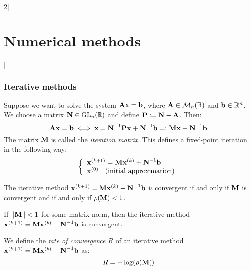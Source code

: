 \documentclass[../../../main.tex]{subfiles}
\begin{document}
\begin{multicols}{2}[\section{Numerical methods}]
  \subsubsection{Iterative methods}
  \begin{definition}
    Suppose we want to solve the system $\boldsymbol{\mathrm{A}}\boldsymbol{\mathrm{x}}=\boldsymbol{\mathrm{b}}$, where $\boldsymbol{\mathrm{A}}\in\mathcal{M}_n(\mathbb{R})$ and $\boldsymbol{\mathrm{b}}\in\mathbb{R}^n$. We choose a matrix $\boldsymbol{\mathrm{N}}\in\mathrm{GL}_n(\mathbb{R})$ and define $\boldsymbol{\mathrm{P}}:=\boldsymbol{\mathrm{N}}-\boldsymbol{\mathrm{A}}$. Then: $$\boldsymbol{\mathrm{A}}\boldsymbol{\mathrm{x}}=\boldsymbol{\mathrm{b}}\iff \boldsymbol{\mathrm{x}}=\boldsymbol{\mathrm{N}}^{-1}\boldsymbol{\mathrm{P}}\boldsymbol{\mathrm{x}}+\boldsymbol{\mathrm{N}}^{-1}\boldsymbol{\mathrm{b}}=:\boldsymbol{\mathrm{M}}\boldsymbol{\mathrm{x}}+\boldsymbol{\mathrm{N}}^{-1}\boldsymbol{\mathrm{b}}$$ The matrix $\boldsymbol{\mathrm{M}}$ is called the \textit{iteration matrix}. This defines a fixed-point iteration in the following way:
    \begin{equation*}
      \left\{
      \begin{array}{l}
        \boldsymbol{\mathrm{x}}^{(k+1)}=\boldsymbol{\mathrm{M}}\boldsymbol{\mathrm{x}}^{(k)}+\boldsymbol{\mathrm{N}}^{-1}\boldsymbol{\mathrm{b}} \\
        \boldsymbol{\mathrm{x}}^{(0)}\quad\text{(initial approximation)}
      \end{array}\right.
    \end{equation*}
  \end{definition}
  \begin{theorem}
    The iterative method $\boldsymbol{\mathrm{x}}^{(k+1)}=\boldsymbol{\mathrm{M}}\boldsymbol{\mathrm{x}}^{(k)}+\boldsymbol{\mathrm{N}}^{-1}\boldsymbol{\mathrm{b}}$ is convergent if and only if $\boldsymbol{\mathrm{M}}$ is convergent and if and only if $\rho(\boldsymbol{\mathrm{M}})<1$.
  \end{theorem}
  \begin{corollary}
    If $\|\boldsymbol{\mathrm{M}}\|<1$ for some matrix norm, then the iterative method $\boldsymbol{\mathrm{x}}^{(k+1)}=\boldsymbol{\mathrm{M}}\boldsymbol{\mathrm{x}}^{(k)}+\boldsymbol{\mathrm{N}}^{-1}\boldsymbol{\mathrm{b}}$ is convergent.
  \end{corollary}
  \begin{definition}
    We define the \textit{rate of convergence $R$} of an iterative method $\boldsymbol{\mathrm{x}}^{(k+1)}=\boldsymbol{\mathrm{M}}\boldsymbol{\mathrm{x}}^{(k)}+\boldsymbol{\mathrm{N}}^{-1}\boldsymbol{\mathrm{b}}$ as: $$R=-\log(\rho(\boldsymbol{\mathrm{M}}))$$
  \end{definition}
  \begin{prop}

\end{prop}
\end{multicols}
\end{document}
